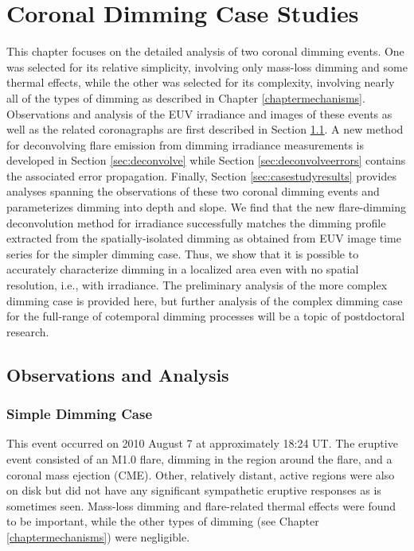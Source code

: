 \chapter{Coronal Dimming Case Studies}
\label{chaptercasestudy}

This chapter focuses on the detailed analysis of two coronal dimming events. One was selected for its relative simplicity, involving only mass-loss dimming and some thermal effects, while the other was selected for its complexity, involving nearly all of the types of dimming as described in Chapter \ref{chaptermechanisms}. Observations and analysis of the EUV irradiance and images of these events as well as the related coronagraphs are first described in Section \ref{sec:observations}. A new method for deconvolving flare emission from dimming irradiance measurements is developed in Section \ref{sec:deconvolve} while Section \ref{sec:deconvolveerrors} contains the associated error propagation. Finally, Section \ref{sec:casestudyresults} provides analyses spanning the observations of these two coronal dimming events and parameterizes dimming into depth and slope. We find that the new flare-dimming deconvolution method for irradiance successfully matches the dimming profile extracted from the spatially-isolated dimming as obtained from EUV image time series for the simpler dimming case. Thus, we show that it is possible to accurately characterize dimming in a localized area even with no spatial resolution, i.e., with irradiance. The preliminary analysis of the more complex dimming case is provided here, but further analysis of the complex dimming case for the full-range of cotemporal dimming processes will be a topic of postdoctoral research.  

\section{Observations and Analysis}
\label{sec:observations}

\subsection{Simple Dimming Case}
\label{sec:observationssimple}
This event occurred on 2010 August 7 at approximately 18:24 UT. The eruptive event consisted of an M1.0 flare, dimming in the region around the flare, and a coronal mass ejection (CME). Other, relatively distant, active regions were also on disk but did not have any significant sympathetic eruptive responses as is sometimes seen. Mass-loss dimming and flare-related thermal effects were found to be important, while the other types of dimming (see Chapter \ref{chaptermechanisms}) were negligible. 

